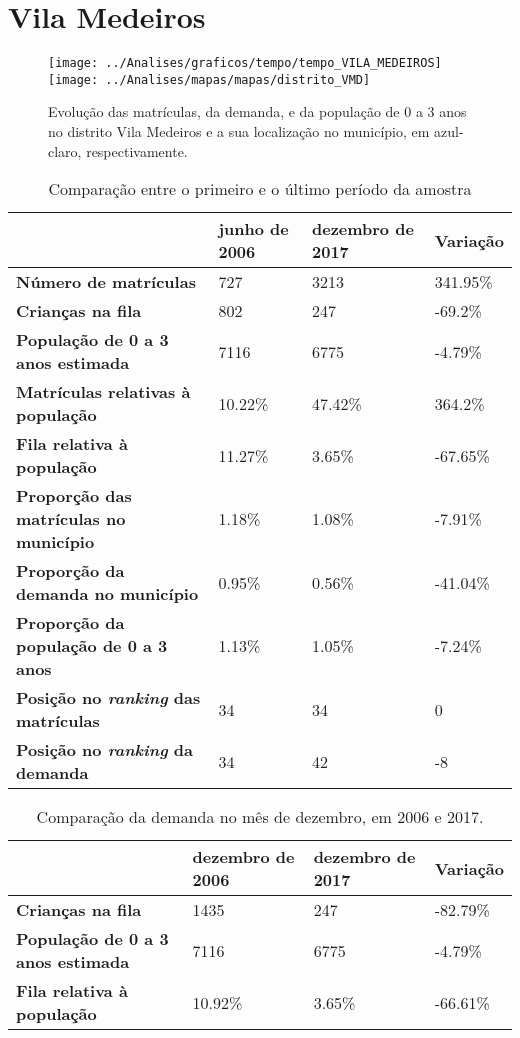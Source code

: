 \section{Vila Medeiros}
\begin{figure}[H]
\centering
\texttt{[image: ../Analises/graficos/tempo/tempo\_VILA\_MEDEIROS]}
\texttt{[image: ../Analises/mapas/mapas/distrito\_VMD]}
\caption{Evolução das matrículas, da demanda, e da população de 0 a 3 anos no distrito Vila Medeiros e a sua localização no município, em azul-claro, respectivamente.}
\end{figure}
\begin{table}[H]
\begin{tabular}{l|l|l|l}
\textbf{}                                      & \textbf{junho de 2006}       & \textbf{dezembro de 2017}    & \textbf{Variação} \\ \hline
\textbf{Número de matrículas}                  & 727 & 3213 & 341.95\% \\ \hline
\textbf{Crianças na fila}                      & 802 & 247 & -69.2\% \\ \hline
\textbf{População de 0 a 3 anos estimada}      & 7116 & 6775 & -4.79\% \\ \hline
\textbf{Matrículas relativas à população}      & 10.22\% & 47.42\% & 364.2\% \\ \hline
\textbf{Fila relativa à população}             & 11.27\% & 3.65\% & -67.65\% \\ \hline
\textbf{Proporção das matrículas no município} & 1.18\% & 1.08\% & -7.91\% \\ \hline
\textbf{Proporção da demanda no município}     & 0.95\% & 0.56\% & -41.04\% \\ \hline
\textbf{Proporção da população de 0 a 3 anos}  & 1.13\% & 1.05\% & -7.24\% \\ \hline
\textbf{Posição no \textit{ranking} das matrículas}     & 34 & 34 & 0 \\ \hline
\textbf{Posição no \textit{ranking} da demanda}         & 34 & 42 & -8 \\ 
\end{tabular}
\caption{Comparação entre o primeiro e o último período da amostra}
\end{table}
\begin{table}[H]
\begin{tabular}{l|l|l|l}
\textbf{}                                 & \textbf{dezembro de 2006} & \textbf{dezembro de 2017} & \textbf{Variação} \\ \hline
\textbf{Crianças na fila}                      & 1435 & 247 & -82.79\% \\ \hline
\textbf{População de 0 a 3 anos estimada}      & 7116 & 6775 & -4.79\% \\ \hline
\textbf{Fila relativa à população}             & 10.92\% & 3.65\% & -66.61\% \\
\end{tabular}
\caption{Comparação da demanda no mês de dezembro, em 2006 e 2017.}
\end{table}
